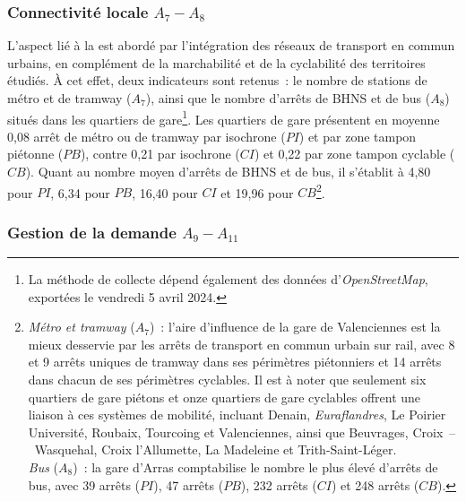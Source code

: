 \begin{refsegment}
\subsubsection*{Connectivité locale \(A_{7} - A_{8}\)
    \label{chap6:indicateurs-accessibility-connectivite}
    }

L'aspect lié à la  est abordé par l'intégration des réseaux de transport en commun urbains, en complément de la \gls{marchabilité} et de la cyclabilité des territoires étudiés. À cet effet, deux indicateurs sont retenus~: le nombre de stations de métro et de tramway (\(A_{7}\)), ainsi que le nombre d'arrêts de \acrshort{BHNS} et de bus (\(A_{8}\)) situés dans les quartiers de gare\footnote{
    La méthode de collecte dépend également des données d'\textsl{OpenStreetMap}, exportées le vendredi 5 avril 2024.
}. Les quartiers de gare présentent en moyenne 0,08 arrêt de métro ou de tramway par isochrone (\(PI\)) et par zone tampon piétonne (\(PB\)), contre 0,21 par isochrone (\(CI\)) et 0,22 par zone tampon cyclable (\(CB\)). Quant au nombre moyen d'arrêts de \acrshort{BHNS} et de bus, il s'établit à 4,80 pour \(PI\), 6,34 pour \(PB\), 16,40 pour \(CI\) et 19,96 pour \(CB\)\footnote{
    \textsl{Métro et tramway} (\(A_{7}\))~: l'aire d'influence de la gare de Valenciennes est la mieux desservie par les arrêts de transport en commun urbain sur rail, avec 8 et 9 arrêts uniques de tramway dans ses périmètres piétonniers et 14 arrêts dans chacun de ses périmètres cyclables. Il est à noter que seulement six quartiers de gare piétons et onze quartiers de gare cyclables offrent une liaison à ces systèmes de mobilité, incluant Denain, \textsl{Euraflandres}, Le Poirier Université, Roubaix, Tourcoing et Valenciennes, ainsi que Beuvrages, Croix~–~Wasquehal, Croix l'Allumette, La Madeleine et Trith-Saint-Léger.
    \\
    \textsl{Bus} (\(A_{8}\))~: la gare d'Arras comptabilise le nombre le plus élevé d'arrêts de bus, avec 39 arrêts (\(PI\)), 47 arrêts (\(PB\)), 232 arrêts (\(CI\)) et 248 arrêts (\(CB\)).
}.%

\subsubsection*{Gestion de la demande \(A_{9} - A_{11}\)
    \label{chap6:indicateurs-accessibility-management-demande}
    }


\end{refsegment}
